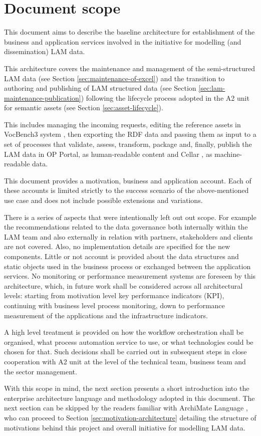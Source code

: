 	\section{Document scope}
	\label{sec:scope}
	
	This document aims to describe the baseline architecture for establishment of the business and application services involved in the initiative for modelling (and dissemination) LAM data. 
	 
	This architecture covers the maintenance and management of the semi-structured LAM data (see Section \ref{sec:maintenance-of-excel}) and the transition to authoring and publishing of LAM structured data (see Section \ref{sec:lam-maintenance-publication}) following the lifecycle process adopted in the A2 unit for semantic assets (see Section \ref{sec:asset-lifecycle}). 
	
	This includes managing the incoming requests, editing the reference assets in VocBench3 system \citep{stellato2017towards,stellatovocbench}, then exporting the RDF data and passing them as input to a set of processes that validate, assess, transform, package and, finally, publish the LAM data in OP Portal, as human-readable content and Cellar \cite{cdm-francesconi2015ontology}, as machine-readable data. 
		
	This document provides a motivation, business and application account. Each of these accounts is limited strictly to the success scenario of the above-mentioned use case and does not include possible extensions and variations.
	
	There is a series of aspects that were intentionally left out out scope. For example the recommendations related to the data governance both internally within the LAM team and also externally in relation with partners, stakeholders and clients are not covered. Also, no implementation details are specified for the new components. Little or not account is provided about the data structures and static objects used in the business process or exchanged between the application services. No monitoring or performance measurement systems are foreseen by this architecture, which, in future work shall be considered across all architectural levels: starting from motivation level key performance indicators (KPI), continuing with business level process monitoring, down to performance measurement of the applications and the infrastructure indicators. 
	
	A high level treatment is provided on how the workflow orchestration shall be organised, what process automation service to use, or what technologies could be chosen for that. Such decisions shall be carried out in subsequent steps in close cooperation with A2 unit at the level of the technical team, business team and the sector management. 
	
	With this scope in mind, the next section presents a short introduction into the enterprise architecture language and methodology adopted in this document. The next section can be skipped by the readers familiar with ArchiMate Language \citep{archimate3.1}, who can proceed to Section \ref{sec:motivation-architecture} detailing the structure of motivations behind this project and overall initiative for modelling LAM data.